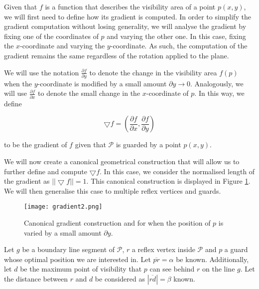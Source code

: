 Given that $f$ is a function that describes the visibility area of a point $p(x, y)$, we will first need to define how its gradient is computed. In order to simplify the gradient computation without losing generality, we will analyse the gradient by fixing one of the coordinates of $p$ and varying the other one. In this case, fixing the $x$-coordinate and varying the $y$-coordinate. As such, the computation of the gradient remains the same regardless of the rotation applied to the plane.


We will use the notation $\frac{\partial f}{\partial y}$ to denote the change in the visibility area $f(p)$ when the $y$-coordinate is modified by a small amount $\partial y \rightarrow 0$. Analogously, we will use $\frac{\partial f}{\partial x}$ to denote the small change in the $x$-coordinate of $p$. In this way, we define 

\begin{equation}
    \bigtriangledown f = (\frac{\partial f}{\partial x}, \frac{\partial f}{\partial y}) \label{eq:gradient}
\end{equation}

to be the gradient of $f$ given that $\mathcal P$ is guarded by a point $p(x, y)$. 

We will now create a canonical geometrical construction that will allow us to further define and compute $\bigtriangledown f$. In this case, we consider the normalised length of the gradient as $||\bigtriangledown f|| = 1$. This canonical construction is displayed in Figure \ref{fig:gradient}. We will then generalise this case to multiple reflex vertices and guards.

\begin{figure}[h!]
    \centering
    \texttt{[image: gradient2.png]}
    \caption{Canonical gradient construction and for when the position of $p$ is varied by a small amount $\partial y$.}
    \label{fig:gradient}
\end{figure}

Let $g$ be a boundary line segment of $\mathcal P$, $r$ a reflex vertex inside $\mathcal P$ and $p$ a guard whose optimal position we are interested in. Let $\overline{pr} = \alpha$ be known. Additionally, let $d$ be the maximum point of visibility that $p$ can see behind $r$ on the line $g$. Let the distance between $r$ and $d$ be considered as $|\overline{rd}| = \beta$ known. 




